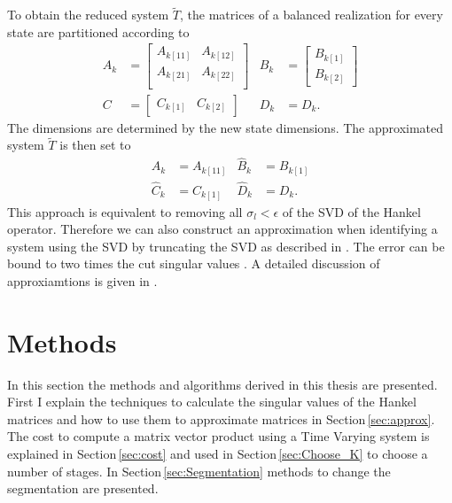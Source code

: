 \documentclass[doctype=mastersthesis,BCOR=15mm,biblatex]{ldvbook}%
\begin{document}
To obtain the reduced system $\tilde{T}$, the matrices of a balanced realization for every state are partitioned according to
\begin{subequations}\label{eq:segmented_system}
\begin{align}
	A_k &=\begin{bmatrix}
	A_{k[11]} & A_{k[12]} \\
	A_{k[21]} & A_{k[22]} \\
	\end{bmatrix}
	&
	B_k &= \begin{bmatrix}
	B_{k[1]} \\ B_{k[2]}
	\end{bmatrix} 
	\\
	C &= \begin{bmatrix}
	C_{k[1]} & C_{k[2]}
	\end{bmatrix}& 
	D_k&=D_k.
\end{align}
\end{subequations}
The dimensions are determined by the new state dimensions.
The approximated system $\tilde{T}$ is then set to
\begin{subequations}
\begin{align}\label{eq:reduced_system}
	\hat{A}_k &= A_{k[11]}  & \hat{B}_k &= B_{k[1]}\\
	\hat{C}_k &=C_{k[1]}      & \hat{D}_k &= D_k.
\end{align}
\end{subequations}
This approach is equivalent to removing all $\sigma_l<\epsilon$ of the SVD of the Hankel operator.
Therefore we can also construct an approximation when identifying a system using the SVD by truncating the SVD as described in \cite{shokoohi_identification_1987}.
The error can be bound to two times the cut singular values \cite{lall_error-bounds_2003}.
A detailed discussion of approxiamtions is given in
\cite{antoulas_approximation_2005}.

\chapter{Methods}\label{chap:methods}
In this section the methods and algorithms derived in this thesis are presented.
First I explain the techniques to calculate the singular values of the Hankel matrices and how to use them to approximate matrices in Section\,\ref{sec:approx}.
The cost to compute a matrix vector product using a Time Varying system is explained in Section\,\ref{sec:cost} and used in Section\,\ref{sec:Choose_K} to choose a number of stages. 
In Section\,\ref{sec:Segmentation} methods to change the segmentation are presented.
\end{document}
